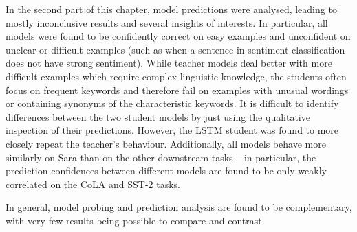 \documentclass[bsc,frontabs,singlespacing,parskip,deptreport]{infthesis}
\begin{document}
{{    In the second part of this chapter, model predictions were analysed, leading to mostly inconclusive results and several insights of interests.
    In particular, all models were found to be confidently correct on easy examples and unconfident on unclear or difficult examples (such as when a sentence in sentiment classification does not have strong sentiment).
    While teacher models deal better with more difficult examples which require complex linguistic knowledge, the students often focus on frequent keywords and therefore fail on examples with unusual wordings or containing synonyms of the characteristic keywords.
    It is difficult to identify differences between the two student models by just using the qualitative inspection of their predictions.
    However, the LSTM student was found to more closely repeat the teacher's behaviour.
    Additionally, all models behave more similarly on Sara than on the other downstream tasks -- in particular, the prediction confidences between different models are found to be only weakly correlated on the CoLA and SST-2 tasks.

    In general, model probing and prediction analysis are found to be complementary, with very few results being possible to compare and contrast.
  }
}
\end{document}
